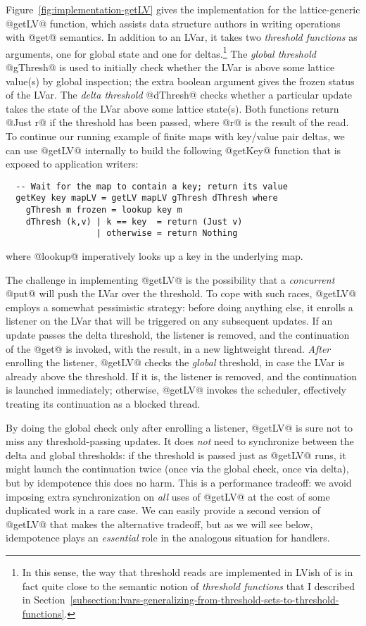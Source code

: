 Figure~\ref{fig:implementation-getLV} gives the implementation for the
lattice-generic @getLV@ function, which assists data structure authors
in writing operations with @get@ semantics.  In addition to an LVar,
it takes two \emph{threshold functions} as arguments, one for global
state and one for deltas.\footnote{In this sense, the way that
  threshold reads are implemented in LVish of is in fact quite close
  to the semantic notion of \emph{threshold functions} that I
  described in
  Section~\ref{subsection:lvars-generalizing-from-threshold-sets-to-threshold-functions}.}
The \emph{global threshold} @gThresh@ is used to initially check
whether the LVar is above some lattice value(s) by global inspection;
the extra boolean argument gives the frozen status of the LVar.  The
\emph{delta threshold} @dThresh@ checks whether a particular update
takes the state of the LVar above some lattice state(s).  Both
functions return @Just r@ if the threshold has been passed, where @r@
is the result of the read.  To continue our running example of finite
maps with key/value pair deltas, we can use @getLV@ internally to
build the following @getKey@ function that is exposed to application
writers:

\begin{lstlisting}
  -- Wait for the map to contain a key; return its value
  getKey key mapLV = getLV mapLV gThresh dThresh where
    gThresh m frozen = lookup key m
    dThresh (k,v) | k == key  = return (Just v)
                  | otherwise = return Nothing 
\end{lstlisting}

where @lookup@ imperatively looks up a key in the underlying map.

The challenge in implementing @getLV@ is the possibility that a
\emph{concurrent} @put@ will push the LVar over the threshold.  To
cope with such races, @getLV@ employs a somewhat pessimistic strategy:
before doing anything else, it enrolls a listener on the LVar that
will be triggered on any subsequent updates.  If an update passes the
delta threshold, the listener is removed, and the continuation of the
@get@ is invoked, with the result, in a new lightweight thread.
\emph{After} enrolling the listener, @getLV@ checks the \emph{global}
threshold, in case the LVar is already above the threshold.  If it is,
the listener is removed, and the continuation is launched immediately;
otherwise, @getLV@ invokes the scheduler, effectively treating its
continuation as a blocked thread.

By doing the global check only after enrolling a listener, @getLV@ is
sure not to miss any threshold-passing updates.  It does \emph{not}
need to synchronize between the delta and global thresholds: if the
threshold is passed just as @getLV@ runs, it might launch the
continuation twice (once via the global check, once via delta), but by
idempotence this does no harm.  This is a performance tradeoff: we
avoid imposing extra synchronization on \emph{all} uses of @getLV@ at
the cost of some duplicated work in a rare case.  We can easily
provide a second version of @getLV@ that makes the alternative
tradeoff, but as we will see below, idempotence plays an
\emph{essential} role in the analogous situation for handlers.

